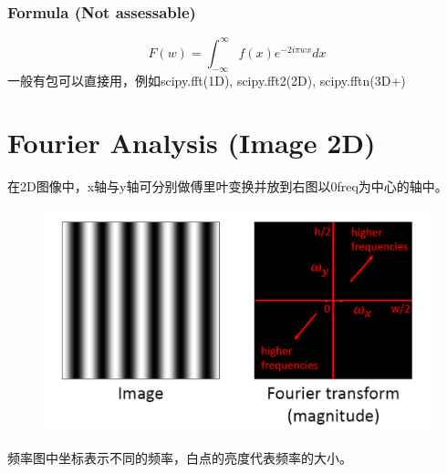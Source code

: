 \documentclass[11pt]{article}
\begin{document}
\subsubsection*{Formula (Not assessable)}
$$F(w)=\int_{-\infty}^{\infty}f(x)e^{-2i\pi wx} dx$$
一般有包可以直接用，例如scipy.fft(1D), scipy.fft2(2D), scipy.fftn(3D+)



\section{Fourier Analysis (Image 2D)}
\begin{framed}
  \begin{center}
    在2D图像中，x轴与y轴可分别做傅里叶变换并放到右图以0freq为中心的轴中。
  \end{center}
\end{framed}
\begin{figure}[bht!]
  \centering
  \includegraphics[width=\textwidth]{images/2d.png}
\end{figure}
\begin{framed}
  \begin{center}
    频率图中坐标表示不同的频率，白点的亮度代表频率的大小。
  \end{center}
\end{framed}

\newpage
\end{document}
